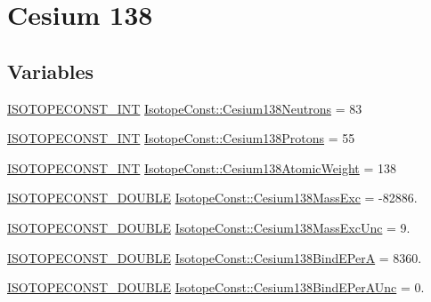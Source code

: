 \hypertarget{group___isotope_const-_cesium-_cs138}{}\section{Cesium 138}
\label{group___isotope_const-_cesium-_cs138}
\subsection*{Variables}
\begin{DoxyCompactItemize}
\item 
\mbox{\hyperlink{group___isotope_const-_macros_ga5f18360b3e99483a35c32d789e62621c}{I\+S\+O\+T\+O\+P\+E\+C\+O\+N\+S\+T\+\_\+\+I\+NT}} \mbox{\hyperlink{group___isotope_const-_cesium-_cs138_gab0529432e6bfa13c0c226cb90f49e92a}{Isotope\+Const\+::\+Cesium138\+Neutrons}} = 83
\item 
\mbox{\hyperlink{group___isotope_const-_macros_ga5f18360b3e99483a35c32d789e62621c}{I\+S\+O\+T\+O\+P\+E\+C\+O\+N\+S\+T\+\_\+\+I\+NT}} \mbox{\hyperlink{group___isotope_const-_cesium-_cs138_gacf1018c057eafbfdc3b8d587293444b3}{Isotope\+Const\+::\+Cesium138\+Protons}} = 55
\item 
\mbox{\hyperlink{group___isotope_const-_macros_ga5f18360b3e99483a35c32d789e62621c}{I\+S\+O\+T\+O\+P\+E\+C\+O\+N\+S\+T\+\_\+\+I\+NT}} \mbox{\hyperlink{group___isotope_const-_cesium-_cs138_gab677933781a9646db675d4adf8536e15}{Isotope\+Const\+::\+Cesium138\+Atomic\+Weight}} = 138
\item 
\mbox{\hyperlink{group___isotope_const-_macros_ga8f45a7272ce02c0b4c65c44636ed719a}{I\+S\+O\+T\+O\+P\+E\+C\+O\+N\+S\+T\+\_\+\+D\+O\+U\+B\+LE}} \mbox{\hyperlink{group___isotope_const-_cesium-_cs138_gaa46353b2bd36bf726cd117fc94fae71e}{Isotope\+Const\+::\+Cesium138\+Mass\+Exc}} = -\/82886.
\item 
\mbox{\hyperlink{group___isotope_const-_macros_ga8f45a7272ce02c0b4c65c44636ed719a}{I\+S\+O\+T\+O\+P\+E\+C\+O\+N\+S\+T\+\_\+\+D\+O\+U\+B\+LE}} \mbox{\hyperlink{group___isotope_const-_cesium-_cs138_gaa1f5723f9c01044432816cc161d9fa25}{Isotope\+Const\+::\+Cesium138\+Mass\+Exc\+Unc}} = 9.
\item 
\mbox{\hyperlink{group___isotope_const-_macros_ga8f45a7272ce02c0b4c65c44636ed719a}{I\+S\+O\+T\+O\+P\+E\+C\+O\+N\+S\+T\+\_\+\+D\+O\+U\+B\+LE}} \mbox{\hyperlink{group___isotope_const-_cesium-_cs138_gabe191d1014727599823f5a4b2177460a}{Isotope\+Const\+::\+Cesium138\+Bind\+E\+PerA}} = 8360.
\item 
\mbox{\hyperlink{group___isotope_const-_macros_ga8f45a7272ce02c0b4c65c44636ed719a}{I\+S\+O\+T\+O\+P\+E\+C\+O\+N\+S\+T\+\_\+\+D\+O\+U\+B\+LE}} \mbox{\hyperlink{group___isotope_const-_cesium-_cs138_gab19a02519373eb027b923a31d9f2f77e}{Isotope\+Const\+::\+Cesium138\+Bind\+E\+Per\+A\+Unc}} = 0.

\end{DoxyCompactItemize}
